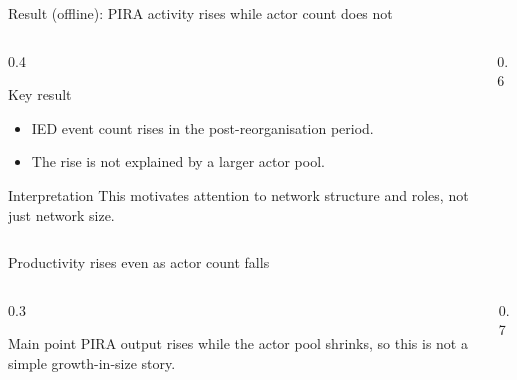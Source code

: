 \begin{frame}{Result (offline): PIRA activity rises while actor count does not}
  \small
  \begin{columns}[T,onlytextwidth]
    \begin{column}{0.4\textwidth}
      \begin{block}{Key result}
        \begin{itemize}
          \item IED event count rises in the post-reorganisation period.
          \item The rise is not explained by a larger actor pool.
        \end{itemize}
      \end{block}

      \begin{exampleblock}{Interpretation}
        This motivates attention to \alert{network structure and roles}, not just network size.
      \end{exampleblock}
    \end{column}

    \begin{column}{0.6\textwidth}
    \end{column}
  \end{columns}

\end{frame}

\begin{frame}{Productivity rises even as actor count falls}
  \small
  \begin{columns}[T,onlytextwidth]
    \begin{column}{0.3\textwidth}
      \begin{block}{Main point}
        PIRA output rises while the actor pool shrinks, so this is not a simple growth-in-size story.
      \end{block}
    \end{column}

    \begin{column}{0.7\textwidth}
    \end{column}
  \end{columns}

\end{frame}

